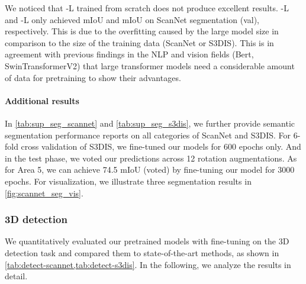 \documentclass[10pt,twocolumn,letterpaper]{article}
\begin{document}
We noticed that \SST-L trained from scratch does not produce excellent results. \SST-L and \SST-L only achieved  mIoU and  mIoU on ScanNet segmentation (val), respectively. This is due to the overfitting caused by the large model size in comparison to the size of the training data (ScanNet or S3DIS). This is in agreement with previous findings in the NLP and vision fields (\eg Bert, SwinTransformerV2) that large transformer models need a considerable amount of data for pretraining to show their advantages.

\paragraph{Additional results}
In \cref{tab:sup_seg_scannet} and \cref{tab:sup_seg_s3dis}, we further provide semantic segmentation performance reports on all categories of ScanNet and S3DIS. For 6-fold cross validation of S3DIS, we fine-tuned our models for 600 epochs only. And in the test phase, we voted our predictions across 12 rotation augmentations. As for Area 5, we can achieve 74.5 mIoU (voted) by fine-tuning our model for 3000 epochs.  For visualization, we illustrate three segmentation results in \cref{fig:scannet_seg_vis}.





\subsubsection{3D detection} \label{subsubsec:exp_det}
We quantitatively evaluated our pretrained models with fine-tuning on the 3D detection task and compared them to state-of-the-art methods, as shown in \cref{tab:detect-scannet,tab:detect-s3dis}. In the following, we analyze the results in detail.
\end{document}
